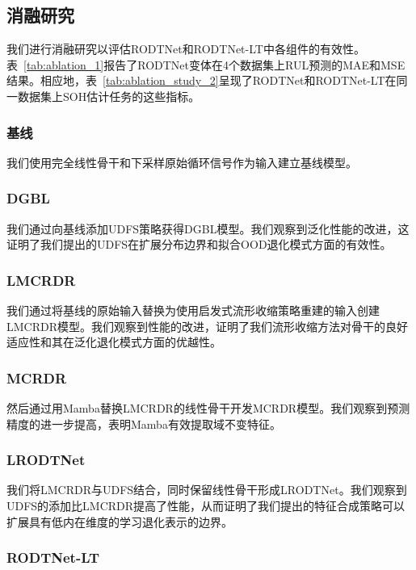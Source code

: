 \documentclass[UTF8,lettersize,journal]{IEEEtran}
\begin{document}
\subsection{消融研究}

我们进行消融研究以评估RODTNet和RODTNet-LT中各组件的有效性。表~\ref{tab:ablation_1}报告了RODTNet变体在4个数据集上RUL预测的MAE和MSE结果。相应地，表~\ref{tab:ablation_study_2}呈现了RODTNet和RODTNet-LT在同一数据集上SOH估计任务的这些指标。

\subsubsection{基线}

我们使用完全线性骨干和下采样原始循环信号作为输入建立基线模型。

\subsubsection{DGBL}

我们通过向基线添加UDFS策略获得DGBL模型。我们观察到泛化性能的改进，这证明了我们提出的UDFS在扩展分布边界和拟合OOD退化模式方面的有效性。

\subsubsection{LMCRDR}

我们通过将基线的原始输入替换为使用启发式流形收缩策略重建的输入创建LMCRDR模型。我们观察到性能的改进，证明了我们流形收缩方法对骨干的良好适应性和其在泛化退化模式方面的优越性。

\subsubsection{MCRDR}

然后通过用Mamba替换LMCRDR的线性骨干开发MCRDR模型。我们观察到预测精度的进一步提高，表明Mamba有效提取域不变特征。

\subsubsection{LRODTNet}

我们将LMCRDR与UDFS结合，同时保留线性骨干形成LRODTNet。我们观察到UDFS的添加比LMCRDR提高了性能，从而证明了我们提出的特征合成策略可以扩展具有低内在维度的学习退化表示的边界。

\subsubsection{RODTNet-LT}
\end{document}

